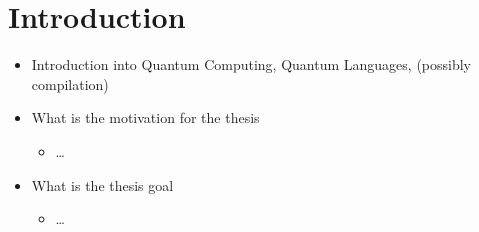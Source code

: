 \chapter{Introduction}
\label{ch:introduction}
\begin{itemize}
    \item Introduction into Quantum Computing, Quantum Languages, (possibly compilation)
    \item What is the motivation for the thesis
    \begin{itemize}
        \item \dots
    \end{itemize}
    \item What is the thesis goal
    \begin{itemize}
        \item \dots
    \end{itemize}
\end{itemize}